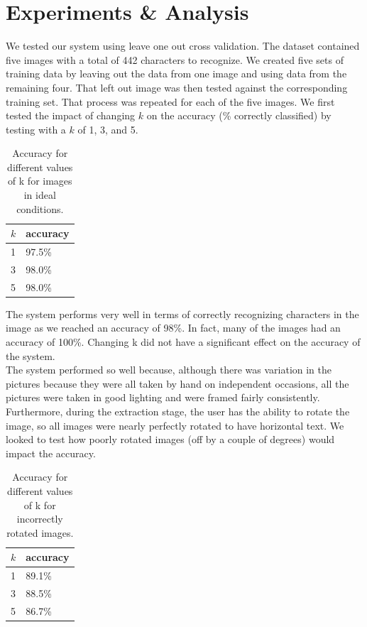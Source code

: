 \documentclass[a4paper,12pt]{article}
\begin{document}
\section{Experiments \& Analysis}
We tested our system using leave one out cross validation. The dataset contained five images with a total of 442 characters to recognize. We created five sets of training data by leaving out the data from one image and using data from the remaining four. That left out image was then tested against the corresponding training set. That process was repeated for each of the five images. We first tested the impact of changing $k$ on the accuracy (\% correctly classified) by testing with a $k$ of 1, 3, and 5.  \\

\begin{table}[h]
  \centering
  \begin{tabular}{l|l}
      $k$ & accuracy \\ \hline
      1 & 97.5\% \\
      3 & 98.0\% \\
      5 & 98.0\%
  \end{tabular}
  \caption{Accuracy for different values of k for images in ideal conditions.}
  \label{table:acc_v_k}
\end{table}

The system performs very well in terms of correctly recognizing characters in the image as we reached an accuracy of 98\%. In fact, many of the images had an accuracy of 100\%. Changing k did not have a significant effect on the accuracy of the system. \\

The system performed so well because, although there was variation in the pictures because they were all taken by hand on independent occasions, all the pictures were taken in good lighting and were framed fairly consistently. Furthermore, during the extraction stage, the user has the ability to rotate the image, so all images were nearly perfectly rotated to have horizontal text. We looked to test how poorly rotated images (off by a couple of degrees) would impact the accuracy. \\

\begin{table}[h]
  \centering
  \begin{tabular}{l|l}
      $k$ & accuracy \\ \hline
      1 & 89.1\% \\
      3 & 88.5\% \\
      5 & 86.7\%
  \end{tabular}
  \caption{Accuracy for different values of k for incorrectly rotated images.}
  \label{table:acc_v_k_rot}
\end{table}
\end{document}
